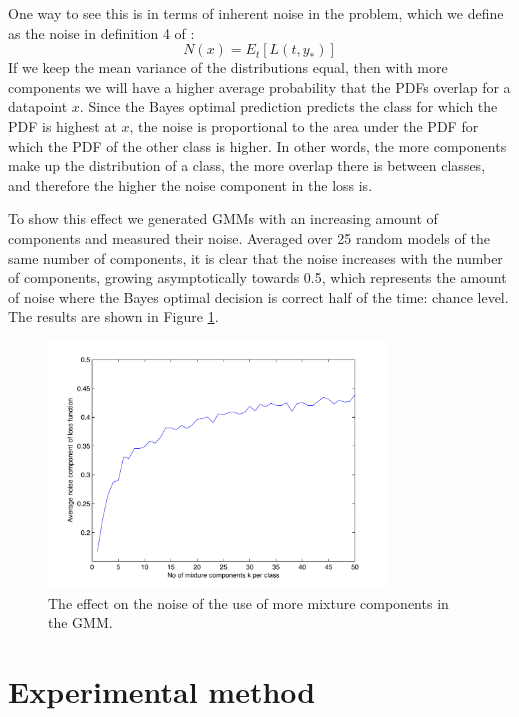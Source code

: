 \documentclass[a4paper]{article}
\begin{document}
One way to see this is in terms of inherent noise in the problem, which we define as the noise in definition 4 of \cite{Domingos2000}:
\begin{equation}
\label{eq:noise}
N(x) = E_t[L(t,y_*)]
\end{equation}
If we keep the mean variance of the distributions equal, then with more components we will have a higher average probability that the \ac{PDF}s overlap for a datapoint $x$. Since the Bayes optimal prediction predicts the class for which the \ac{PDF} is highest at $x$, the noise is proportional to the area under the \ac{PDF} for which the \ac{PDF} of the other class is higher. In other words, the more components make up the distribution of a class, the more overlap there is between classes, and therefore the higher the noise component in the loss is.

To show this effect we generated \ac{GMM}s with an increasing amount of components and measured their noise. Averaged over 25 random models of the same number of components, it is clear that the noise increases with the number of components, growing asymptotically towards 0.5, which represents the amount of noise where the Bayes optimal decision is correct half of the time: chance level. The results are shown in Figure \ref{fig:noisepercomp}.

\begin{figure}[H!]
    \centering
    \includegraphics[width=0.8\textwidth]{noise_per_k.pdf}
    \caption{The effect on the noise of the use of more mixture components in the \ac{GMM}. \label{fig:noisepercomp}}
\end{figure}

\section{Experimental method}
\label{sec:experimental_method}
\end{document}
